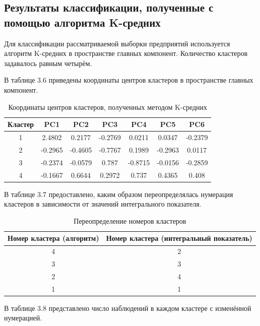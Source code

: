 \documentclass[14pt,a4paper]{extarticle}
\begin{document}
\subsection{Результаты классификации, полученные с помощью алгоритма K-средних}

Для классификации рассматриваемой выборки предприятий используется алгоритм K-средних в пространстве главных компонент. Количество кластеров задавалось равным четырём.

В таблице 3.6 приведены координаты центров кластеров в пространстве главных компонент.

\begin{table}[H]
    \centering
    \caption{Координаты центров кластеров, полученных методом K-средних}
    \label{tab:kmeans_centers}
    \begin{tabular}{c|cccccc}
        \toprule
        Кластер & PC1 & PC2 & PC3 & PC4 & PC5 & PC6 \\
        \midrule
        1 & 2.4802 & 0.2177 & -0.2769 & 0.0211 & 0.0347 & -0.2379 \\
        2 & -0.2965 & -0.4605 & -0.7767 & 0.1989 & -0.2963 & 0.0117 \\
        3 & -0.2374 & -0.0579 & 0.787 & -0.8715 & -0.0156 & -0.2859 \\
        4 & -0.1667 & 0.6644 & 0.2972 & 0.737 & 0.4365 & 0.408 \\
        \bottomrule
    \end{tabular}
\end{table}

В таблице 3.7 предоставлено, каким образом переопределялась нумерация кластеров в зависимости от значений интегрального показателя.

\begin{table}[H]
    \centering
    \caption{Переопределение номеров кластеров}
    \label{tab:recode}
    \begin{tabular}{cc}
        \toprule
        Номер кластера (алгоритм) & Номер кластера (интегральный показатель) \\
        \midrule
        4 & 2 \\
        3 & 3 \\
        2 & 4 \\
        1 & 1 \\
        \bottomrule
    \end{tabular}
\end{table}

В таблице 3.8 представлено число наблюдений в каждом кластере с изменённой нумерацией.
\end{document}
